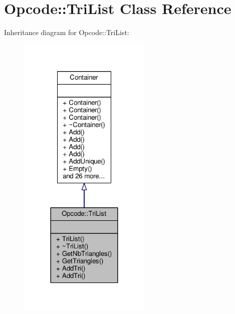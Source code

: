 \hypertarget{classOpcode_1_1TriList}{}\section{Opcode\+:\+:Tri\+List Class Reference}
\label{classOpcode_1_1TriList}


Inheritance diagram for Opcode\+:\+:Tri\+List\+:
\nopagebreak
\begin{figure}[H]
\begin{center}
\leavevmode
\includegraphics[width=180pt]{df/df3/classOpcode_1_1TriList__inherit__graph}
\end{center}
\end{figure}


